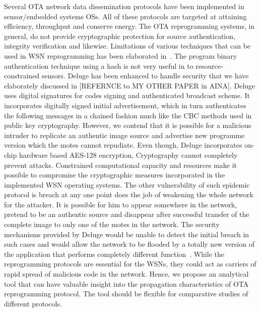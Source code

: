 \documentclass[conference,final]{IEEEtran}
\begin{document}

Several OTA network data dissemination protocols have been implemented in sensor/embedded systems OSs.
All of these protocols are targeted at attaining efficiency, throughput and conserve energy.
The  OTA reprogramming systems, in general, do not provide cryptographic protection for source authentication, integrity verification and likewise. 
Limitations of various techniques that can be used in WSN reprogramming has been elaborated in~\cite{1127826}. 
The program binary authentication technique using a hash is not very useful in to resource-constrained sensors. 
Deluge has been enhanced to handle security that we have elaborately discussed in [REFERNCE to MY OTHER PAPER in AINA]. 
Deluge uses digital signatures for codes signing and authenticated broadcast scheme. 
It incorporates digitally signed initial advertisement, which in turn authenticates the following messages in a chained fashion much like the CBC methods used in public key cryptography.
However, we contend that it is possible for a malicious intruder to replicate an authentic image source and advertise new programme version which the motes cannot repudiate. 
Even though,  Deluge incorporates on-chip hardware based AES-128 encryption,
Cryptography cannot completely prevent attacks.%
Constrained computational capacity and resources make it possible to compromise the cryptographic measures incorporated in the implemented WSN operating systems.
The other vulnerability of such epidemic protocol is breach at any one point does the job of weakening the whole network for the attacker. 
It is possible for him to appear somewhere in the network, pretend to be an authentic source and disappear after successful transfer of the complete image to only one of the motes in the network. 
The security mechanisms provided by Deluge would be unable to detect the initial breach in such cases and would allow the network to be flooded by a totally new version of the application that performs completely different function~\cite{Karlof:2004:TLL:1031495.1031515}.
While the reprogramming protocols are essential for the WSNs, they could act as carriers of rapid spread of malicious code in the network.
Hence, we propose an analytical tool that can have valuable insight into the propagation characteristics of OTA reprogramming protocol. 
The tool should be flexible for comparative studies of different protocols. 
\end{document}
